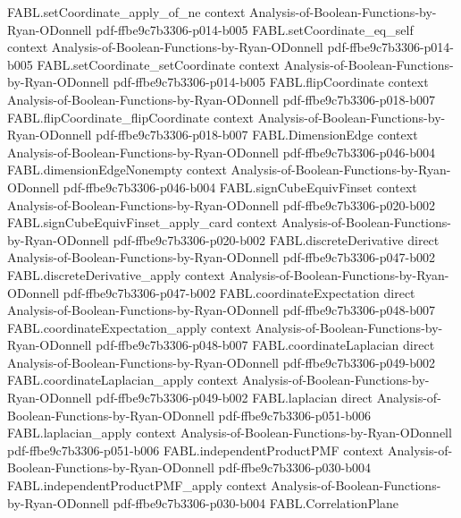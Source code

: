 \begin{theorem}
  {FABL.setCoordinate_apply_of_ne}
  {context}
  {Analysis-of-Boolean-Functions-by-Ryan-ODonnell}
  {pdf-ffbe9c7b3306-p014-b005}
\proofstep
  {FABL.setCoordinate_eq_self}
  {context}
  {Analysis-of-Boolean-Functions-by-Ryan-ODonnell}
  {pdf-ffbe9c7b3306-p014-b005}
\proofstep
  {FABL.setCoordinate_setCoordinate}
  {context}
  {Analysis-of-Boolean-Functions-by-Ryan-ODonnell}
  {pdf-ffbe9c7b3306-p014-b005}
\proofstep
  {FABL.flipCoordinate}
  {context}
  {Analysis-of-Boolean-Functions-by-Ryan-ODonnell}
  {pdf-ffbe9c7b3306-p018-b007}
\proofstep
  {FABL.flipCoordinate_flipCoordinate}
  {context}
  {Analysis-of-Boolean-Functions-by-Ryan-ODonnell}
  {pdf-ffbe9c7b3306-p018-b007}
\proofstep
  {FABL.DimensionEdge}
  {context}
  {Analysis-of-Boolean-Functions-by-Ryan-ODonnell}
  {pdf-ffbe9c7b3306-p046-b004}
\proofstep
  {FABL.dimensionEdgeNonempty}
  {context}
  {Analysis-of-Boolean-Functions-by-Ryan-ODonnell}
  {pdf-ffbe9c7b3306-p046-b004}
\proofstep
  {FABL.signCubeEquivFinset}
  {context}
  {Analysis-of-Boolean-Functions-by-Ryan-ODonnell}
  {pdf-ffbe9c7b3306-p020-b002}
\proofstep
  {FABL.signCubeEquivFinset_apply_card}
  {context}
  {Analysis-of-Boolean-Functions-by-Ryan-ODonnell}
  {pdf-ffbe9c7b3306-p020-b002}
\proofstep
  {FABL.discreteDerivative}
  {direct}
  {Analysis-of-Boolean-Functions-by-Ryan-ODonnell}
  {pdf-ffbe9c7b3306-p047-b002}
\proofstep
  {FABL.discreteDerivative_apply}
  {context}
  {Analysis-of-Boolean-Functions-by-Ryan-ODonnell}
  {pdf-ffbe9c7b3306-p047-b002}
\proofstep
  {FABL.coordinateExpectation}
  {direct}
  {Analysis-of-Boolean-Functions-by-Ryan-ODonnell}
  {pdf-ffbe9c7b3306-p048-b007}
\proofstep
  {FABL.coordinateExpectation_apply}
  {context}
  {Analysis-of-Boolean-Functions-by-Ryan-ODonnell}
  {pdf-ffbe9c7b3306-p048-b007}
\proofstep
  {FABL.coordinateLaplacian}
  {direct}
  {Analysis-of-Boolean-Functions-by-Ryan-ODonnell}
  {pdf-ffbe9c7b3306-p049-b002}
\proofstep
  {FABL.coordinateLaplacian_apply}
  {context}
  {Analysis-of-Boolean-Functions-by-Ryan-ODonnell}
  {pdf-ffbe9c7b3306-p049-b002}
\proofstep
  {FABL.laplacian}
  {direct}
  {Analysis-of-Boolean-Functions-by-Ryan-ODonnell}
  {pdf-ffbe9c7b3306-p051-b006}
\proofstep
  {FABL.laplacian_apply}
  {context}
  {Analysis-of-Boolean-Functions-by-Ryan-ODonnell}
  {pdf-ffbe9c7b3306-p051-b006}
\proofstep
  {FABL.independentProductPMF}
  {context}
  {Analysis-of-Boolean-Functions-by-Ryan-ODonnell}
  {pdf-ffbe9c7b3306-p030-b004}
\proofstep
  {FABL.independentProductPMF_apply}
  {context}
  {Analysis-of-Boolean-Functions-by-Ryan-ODonnell}
  {pdf-ffbe9c7b3306-p030-b004}
\proofstep
  {FABL.CorrelationPlane}

\end{theorem}
